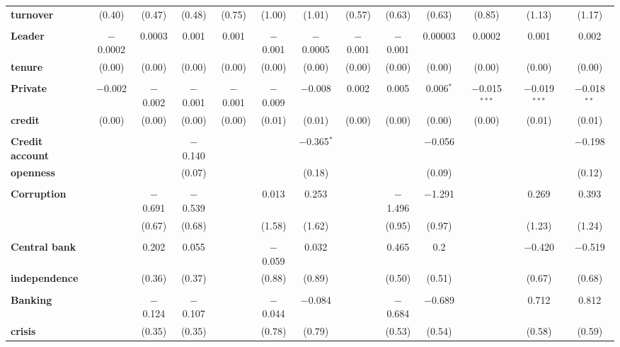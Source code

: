 \begin{table}[tb]
{\begin{tabular}{@{\extracolsep{5pt}}lcccccccccccc}
\textbf{turnover}	&	 (0.40)	&	 (0.47)	&	 (0.48)	&	 (0.75)	&	 (1.00)	&	 (1.01)	&	 (0.57)	&	 (0.63)	&	 (0.63)	&	 (0.85)	&	 (1.13)	&	 (1.17)	\\
	&		&		&		&		&		&		&		&		&		&		&		&		\\
\textbf{Leader}	&	 $-$0.0002 	&	0.0003	&	0.001	&	0.001	&	 $-$0.001 	&	 $-$0.0005 	&	 $-$0.001 	&	 $-$0.001 	&	0.00003	&	0.0002	&	0.001	&	0.002	\\
\textbf{tenure}	&	 (0.00)	&	 (0.00)	&	 (0.00)	&	 (0.00)	&	 (0.00)	&	 (0.00)	&	 (0.00)	&	 (0.00)	&	 (0.00)	&	 (0.00)	&	 (0.00)	&	 (0.00)	\\
	&		&		&		&		&		&		&		&		&		&		&		&		\\
\textbf{Private}	&	 $-$0.002 	&	 $-$0.002 	&	 $-$0.001 	&	 $-$0.001 	&	 $-$0.009 	&	 $-$0.008 	&	0.002	&	0.005	&	 0.006$^{*}$ 	&	 $-$0.015$^{***}$ 	&	 $-$0.019$^{***}$ 	&	 $-$0.018$^{**}$  	\\
\textbf{credit}	&	 (0.00)	&	 (0.00)	&	 (0.00)	&	 (0.00)	&	 (0.01)	&	 (0.01)	&	 (0.00)	&	 (0.00)	&	 (0.00)	&	 (0.00)	&	 (0.01)	&	 (0.01)	\\
	&		&		&		&		&		&		&		&		&		&		&		&		\\
\textbf{Credit account}	&	  	&	  	&	 $-$0.140 	&	  	&	  	&	 $-$0.365$^{*}$ 	&	  	&	  	&	 $-$0.056 	&	  	&	  	&	 $-$0.198  	\\
\textbf{openness}	&	    	&	    	&	 (0.07)	&	    	&	    	&	 (0.18)	&	    	&	    	&	 (0.09)	&	    	&	    	&	 (0.12)	\\
	&		&		&		&		&		&		&		&		&		&		&		&		\\
\textbf{Corruption}	&	  	&	 $-$0.691 	&	 $-$0.539 	&	  	&	0.013	&	0.253	&	  	&	 $-$1.496 	&	 $-$1.291 	&	  	&	0.269	&	0.393	\\
	&	    	&	 (0.67)	&	 (0.68)	&	    	&	 (1.58)	&	 (1.62)	&	    	&	 (0.95)	&	 (0.97)	&	    	&	 (1.23)	&	 (1.24)	\\
	&		&		&		&		&		&		&		&		&		&		&		&		\\
\textbf{Central bank}	&	  	&	0.202	&	0.055	&	  	&	 $-$0.059 	&	0.032	&	  	&	0.465	&	0.2	&	  	&	 $-$0.420 	&	 $-$0.519  	\\
\textbf{independence}	&	    	&	 (0.36)	&	 (0.37)	&	    	&	 (0.88)	&	 (0.89)	&	    	&	 (0.50)	&	 (0.51)	&	    	&	 (0.67)	&	 (0.68)	\\
	&		&		&		&		&		&		&		&		&		&		&		&		\\
\textbf{Banking}	&	  	&	 $-$0.124 	&	 $-$0.107 	&	  	&	 $-$0.044 	&	 $-$0.084 	&	  	&	 $-$0.684 	&	 $-$0.689 	&	  	&	0.712	&	0.812	\\
\textbf{crisis}	&	    	&	 (0.35)	&	 (0.35)	&	    	&	 (0.78)	&	 (0.79)	&	    	&	 (0.53)	&	 (0.54)	&	    	&	 (0.58)	&	 (0.59)	\\

\end{tabular}}
\end{table}
